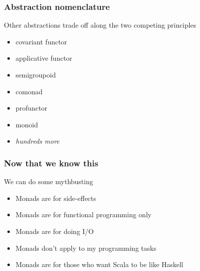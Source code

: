 \begin{frame}
\frametitle{Abstraction nomenclature}
\begin{block}{Other abstractions trade off along the two competing principles}
\begin{itemize}
  \item covariant functor
  \item applicative functor
  \item semigroupoid
  \item comonad
  \item profunctor
  \item monoid
  \item \emph{hundreds more}
\end{itemize}
\end{block}
\end{frame}


\begin{frame}
\frametitle{Now that we know this}
\begin{block}{We can do some mythbusting}
\begin{itemize}
  \item<1-> Monads are for side-effects
  \item<2-> Monads are for functional programming only
  \item<3-> Monads are for doing I/O
  \item<4-> Monads don't apply to my programming tasks
  \item<5-> Monads are for those who want Scala to be like Haskell
\end{itemize}
\end{block}
\end{frame}
